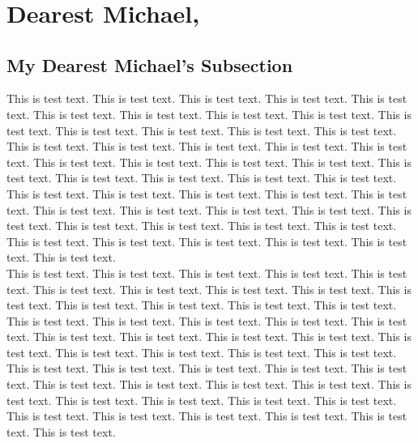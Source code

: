 \documentclass[11pt, english]{article}
\begin{document}

	\title{\textit{}}
	\author{\textit{}}
	\date{}
	\maketitle

\section{Dearest Michael,}

\subsection{My Dearest Michael's Subsection}

\LARGE\fmmfamily

This is test text. This is test text. This is test text. This is test text. This is test text. This is test text. This is test text. This is test text. This is test text. This is test text. This is test text. This is test text. This is test text. This is test text. This is test text. This is test text. This is test text. This is test text. This is test text. This is test text. This is test text. This is test text. This is test text. This is test text. This is test text. This is test text. This is test text. This is test text. This is test text. This is test text. This is test text. This is test text. This is test text. This is test text. This is test text. This is test text. This is test text. This is test text. This is test text. This is test text. This is test text. This is test text. This is test text. This is test text. This is test text. This is test text. This is test text. This is test text.\\

This is test text. This is test text. This is test text. This is test text. This is test text. This is test text. This is test text. This is test text. This is test text. This is test text. This is test text. This is test text. This is test text. This is test text. This is test text. This is test text. This is test text. This is test text. This is test text. This is test text. This is test text. This is test text. This is test text. This is test text. This is test text. This is test text. This is test text. This is test text. This is test text. This is test text. This is test text. This is test text. This is test text. This is test text. This is test text. This is test text. This is test text. This is test text. This is test text. This is test text. This is test text. This is test text. This is test text. This is test text. This is test text. This is test text. This is test text. This is test text.\\
\end{document}
